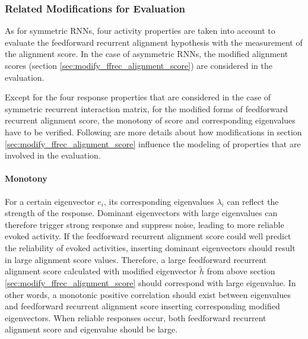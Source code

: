 \documentclass[11pt]{article}
\begin{document}
	\subsubsection{Related Modifications for Evaluation} \label{sec:modification_asym}
	As for symmetric RNNs, four activity properties are taken into account to evaluate the feedforward recurrent alignment hypothesis with the measurement of the alignment score. In the case of asymmetric RNNs, the modified alignment scores (section \ref{sec:modify_ffrec_alignment_score}) are considered in the evaluation. 
	
	Except for the four response properties that are considered in the case of symmetric recurrent interaction matrix, for the modified forms of feedforward recurrent alignment score, the monotony of score and corresponding eigenvalues have to be verified. Following are more details about how modifications in section \ref{sec:modify_ffrec_alignment_score} influence the modeling of properties that are involved in the evaluation. 
	
	\paragraph{Monotony} For a certain eigenvector $e_i$, its corresponding eigenvalues $\lambda_i$ can reflect the strength of the response. %
	Dominant eigenvectors with large eigenvalues can therefore trigger strong response and suppress noise, leading to more reliable evoked activity. If the feedforward recurrent alignment score could well predict the reliability of evoked activities, inserting dominant eigenvectors should result in large alignment score values. Therefore, a large feedforward recurrent alignment score calculated with modified eigenvector $\tilde{h}$ from above section \ref{sec:modify_ffrec_alignment_score} should correspond with large eigenvalue. In other words, a monotonic positive correlation should exist between eigenvalues and feedforward recurrent alignment score inserting corresponding modified eigenvectors. When reliable responses occur, both feedforward recurrent alignment score and eigenvalue should be large.  
	
\end{document}
